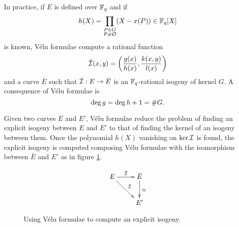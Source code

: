 In practice, if $E$ is defined over $\mathbb{F}_q$ and if
\[h(X) = \prod_{\substack{P\in G\\P\ne\mathcal{O}}}(X - x(P)) \in \mathbb{F}_q[X]\]
is known, Vélu formulae compute a rational function
\begin{equation}
  \label{eq:isog}
  \bar{\mathcal{I}}(x,y) = \left(\frac{g(x)}{h(x)}, \frac{k(x,y)}{l(x)}\right)  
\end{equation}
and a curve $\bar{E}$ such that $\bar{\mathcal{I}} : E\rightarrow\bar{E}$ is an
$\mathbb{F}_q$-rational isogeny of kernel $G$. A consequence of Vélu formulae
is
\begin{equation}
  \label{eq:velu-deg}
  \deg g = \deg h + 1 = \# G
  \text{.}
\end{equation}

Given two curves $E$ and $E'$, Vélu formulae reduce the problem of
finding an explicit isogeny between $E$ and $E'$ to that of finding
the kernel of an isogeny between them. Once the polynomial $h(X)$
vanishing on $\ker\mathcal{I}$ is found, the explicit isogeny is computed
composing Vélu formulae with the isomorphism between $\bar{E}$ and
$E'$ as in figure \ref{fig:velu}.

\begin{figure}
  \centering
  \[\xymatrix{
    E \ar[r]^{\bar{\I}} \ar[rd]^\I & \bar{E} \ar[d]^{\simeq}\\
    & E'
  }\]
  \caption{Using Vélu formulae to compute an explicit isogeny.}
  \label{fig:velu}
\end{figure}




%
